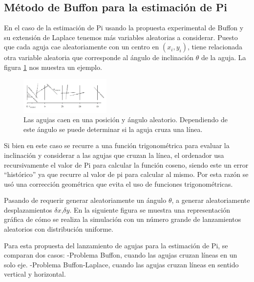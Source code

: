 \documentclass{rbf}
\begin{document}
\subsection{Método de Buffon para la estimación de Pi}

En el caso de la estimación de Pi usando la propuesta experimental de Buffon y su extensión de Laplace tenemos más variables aleatorias a considerar. Puesto que cada aguja cae aleatoriamente con un centro en $(𝑥_𝑖,𝑦_𝑖)$, tiene relacionada otra variable aleatoria que corresponde al ángulo de inclinación $\theta$ de la aguja. La figura \ref{aguja} nos muestra un ejemplo.



\begin{figure}[tbp!]
 \centering
  \includegraphics[width=0.4\textwidth]{figures/agujas.jpg}
	\caption{Las agujas caen en una posición y ángulo aleatorio. Dependiendo de este ángulo se puede determinar si la aguja cruza una línea.\cite{Statistics}}
 \label{aguja}
\end{figure}

Si bien en este caso se recurre a una función trigonométrica para evaluar la inclinación y considerar a las agujas que cruzan la línea, el ordenador usa recursivamente el valor de Pi para calcular la función coseno, siendo este un error “histórico” ya que recurre al valor de pi para calcular al mismo. Por esta razón se usó una corrección geométrica que evita el uso de funciones trigonométricas.

Pasando de requerir generar aleatoriamente un ángulo $\theta$, a generar aleatoriamente desplazamientos $\delta x$,$\delta y$. En la siguiente figura se muestra una representación gráfica de cómo se realiza la simulación con un número grande de lanzamientos aleatorios con distribución uniforme. \cite{Statistics}

Para esta propuesta del lanzamiento de agujas para la estimación de Pi, se comparan dos casos:
-Problema Buffon, cuando las agujas cruzan líneas en un solo eje.
-Problema Buffon-Laplace, cuando las agujas cruzan líneas en sentido vertical y horizontal.
\end{document}
